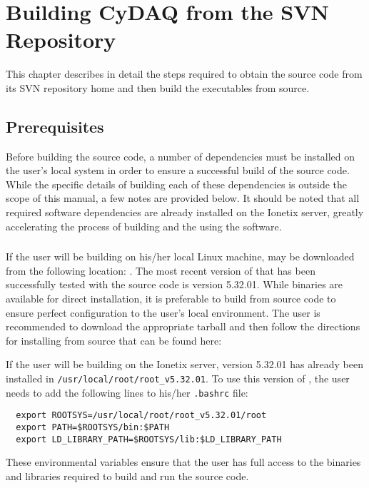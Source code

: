 \chapter{Building CyDAQ from the SVN Repository}
\label{chap:svn}
This chapter describes in detail the steps required to obtain the \ADAQ
source code from its SVN repository home and then build the \ADAQ
executables from source.

\section{Prerequisites}
\label{sec:prereqs}
Before building the \ADAQ source code, a number of dependencies must be
installed on the user's local system in order to ensure a successful
build of the \ADAQ source code. While the specific details of building
each of these dependencies is outside the scope of this manual, a few
notes are provided below. It should be noted that all required
software dependencies are already installed on the Ionetix server,
greatly accelerating the process of building and the using the \ADAQ
software.

\subsection{\ROOT}
If the user will be building \ADAQ on his/her local Linux machine, \ROOT
may be downloaded from the following location:
. The most
recent version of \ROOT that has been successfully tested with the \ADAQ
source code is version 5.32.01. While \ROOT binaries are available for
direct installation, it is preferable to build \ROOT from source code
to ensure perfect configuration to the user's local environment. The
user is recommended to download the appropriate tarball and then
follow the directions for installing \ROOT from source that can be
found here:

If the user will be building \ADAQ on the Ionetix server, \ROOT version
5.32.01 has already been installed in
\texttt{/usr/local/root/root\_v5.32.01}. To use this version of \ROOT,
the user needs to add the following lines to his/her \texttt{.bashrc}
file:
\begin{lstlisting}
  export ROOTSYS=/usr/local/root/root_v5.32.01/root
  export PATH=$ROOTSYS/bin:$PATH
  export LD_LIBRARY_PATH=$ROOTSYS/lib:$LD_LIBRARY_PATH
\end{lstlisting}
These environmental variables ensure that the user has full access to
the \ROOT binaries and libraries required to build and run the \ADAQ
source code.


